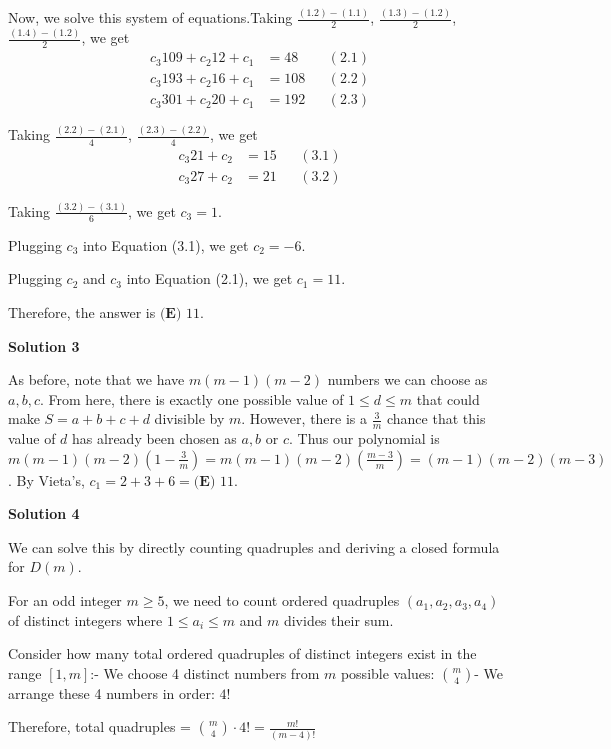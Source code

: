\begin{enumerate}
 Now, we solve this system of equations.Taking $\frac{(1.2)-(1.1)}{2}$, $\frac{(1.3)-(1.2)}{2}$, $\frac{(1.4)-(1.2)}{2}$, we get
 \begin{align*} c_3 109 + c_2 12 + c_1 & = 48 && (2.1) \\ c_3 193 + c_2 16 + c_1 & = 108 && (2.2) \\ c_3 301 + c_2 20 + c_1 & = 192 && (2.3) \end{align*}


 Taking $\frac{(2.2)-(2.1)}{4}$, $\frac{(2.3)-(2.2)}{4}$, we get
 \begin{align*} c_3 21 + c_2  & = 15 && (3.1) \\ c_3 27 + c_2 & = 21 && (3.2) \end{align*}


 Taking $\frac{(3.2)-(3.1)}{6}$, we get $c_3 = 1$.

 Plugging $c_3$ into Equation (3.1), we get $c_2 = - 6$.

 Plugging $c_2$ and $c_3$ into Equation (2.1), we get $c_1 = 11$.

 Therefore, the answer is $\boxed{\textbf{(E) }11}$.

 



\textbf{Solution 3}

As before, note that we have $m(m-1)(m-2)$ numbers we can choose as $a,b,c.$ From here, there is exactly one possible value of $1 \leq d \leq m$ that could make $S=a+b+c+d$ divisible by $m.$ However, there is a $\frac{3}{m}$ chance that this value of $d$ has already been chosen as $a,b$ or $c$. Thus our polynomial is $m(m-1)(m-2)\left(1-\frac{3}{m}\right)=m(m-1)(m-2)\left(\frac{m-3}{m}\right)=(m-1)(m-2)(m-3)$. By Vieta's, $c_1 = 2+3+6=\boxed{\textbf{(E) } 11}$.

 



\textbf{Solution 4}

We can solve this by directly counting quadruples and deriving a closed formula for $D(m)$.

 For an odd integer $m \geq 5$, we need to count ordered quadruples $(a_1,a_2,a_3,a_4)$ of distinct integers where $1 \leq a_i \leq m$ and $m$ divides their sum.

 Consider how many total ordered quadruples of distinct integers exist in the range $[1,m]$:- We choose 4 distinct numbers from $m$ possible values: $\binom{m}{4}$- We arrange these 4 numbers in order: $4!$

 Therefore, total quadruples = $\binom{m}{4} \cdot 4! = \frac{m!}{(m-4)!}$


\end{enumerate}
